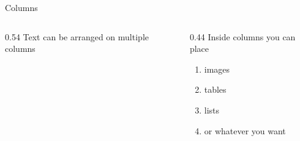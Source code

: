 \begin{frame}{Columns}
  \vfill
  \begin{columns}[c]
    \begin{column}{0.54\textwidth}
      Text can be arranged on multiple columns
    \end{column}
    \begin{column}{0.44\textwidth}
      Inside columns you can place
      \begin{enumerate}
        \item images
        \item tables
        \item lists
        \item or whatever you want
      \end{enumerate}
    \end{column}
  \end{columns}
  \vfill
\end{frame}
